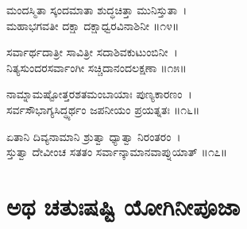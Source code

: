 ಮಂದಸ್ಮಿತಾ ಸ್ಕಂದಮಾತಾ ಶುದ್ಧಚಿತ್ತಾ ಮುನಿಸ್ತುತಾ~।\\
ಮಹಾಭಗವತೀ ದಕ್ಷಾ ದಕ್ಷಾಧ್ವರವಿನಾಶಿನೀ ॥೧೪॥

ಸರ್ವಾರ್ಥದಾತ್ರೀ ಸಾವಿತ್ರೀ ಸದಾಶಿವಕುಟುಂಬಿನೀ~।\\
ನಿತ್ಯಸುಂದರಸರ್ವಾಂಗೀ ಸಚ್ಚಿದಾನಂದಲಕ್ಷಣಾ ॥೧೫॥

ನಾಮ್ನಾಮಷ್ಟೋತ್ತರಶತಮಂಬಾಯಾಃ ಪುಣ್ಯಕಾರಣಂ~।\\
ಸರ್ವಸೌಭಾಗ್ಯಸಿದ್ಧ್ಯರ್ಥಂ ಜಪನೀಯಂ ಪ್ರಯತ್ನತಃ ॥೧೬॥

ಏತಾನಿ ದಿವ್ಯನಾಮಾನಿ ಶ್ರುತ್ವಾ ಧ್ಯಾತ್ವಾ ನಿರಂತರಂ~।\\
ಸ್ತುತ್ವಾ ದೇವೀಂಚ ಸತತಂ ಸರ್ವಾನ್ಕಾಮಾನವಾಪ್ನುಯಾತ್ ॥೧೭॥
\newpage
\section{ಅಥ ಚತುಃಷಷ್ಟಿ ಯೋಗಿನೀಪೂಜಾ}
